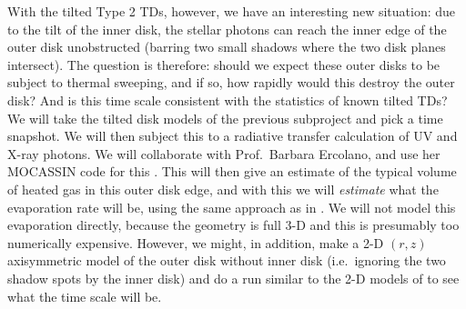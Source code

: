 \documentclass[10pt,fleqn,twoside,a4paper]{article}
\begin{document}
\begin{enumerate}
  With the tilted Type 2 TDs, however, we have an interesting new situation:
  due to the tilt of the inner disk, the stellar photons can reach the inner
  edge of the outer disk unobstructed (barring two small shadows where the
  two disk planes intersect). The question is therefore: should we expect
  these outer disks to be subject to thermal sweeping, and if so, how
  rapidly would this destroy the outer disk? And is this time scale
  consistent with the statistics of known tilted TDs? We will take the
  tilted disk models of the previous subproject and pick a time snapshot. We
  will then subject this to a radiative transfer calculation of UV and X-ray
  photons.  We will collaborate with Prof.~Barbara Ercolano, and use her
  MOCASSIN code for this \citep{2003MNRAS.340.1136E, 2005MNRAS.362.1038E,
    2008ApJS..175..534E}. This will then give an estimate of the typical
  volume of heated gas in this outer disk edge, and with this we will {\em
    estimate} what the evaporation rate will be, using the same approach as
  in \citet{2008ApJ...688..398E, 2009ApJ...699.1639E}. We will not model
  this evaporation directly, because the geometry is full 3-D and this is
  presumably too numerically expensive. However, we might, in addition, make
  a 2-D $(r,z)$ axisymmetric model of the outer disk without inner disk
  (i.e.~ignoring the two shadow spots by the inner disk) and do a run
  similar to the 2-D models of \citet{2012MNRAS.422.1880O} to see what the
  time scale will be. 

\end{enumerate}
\end{document}
